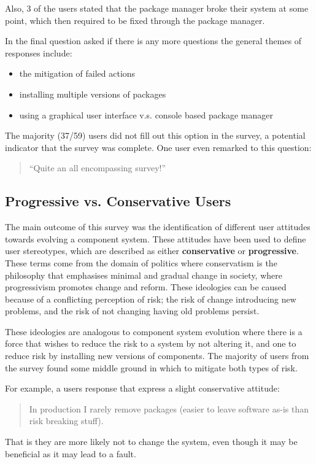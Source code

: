 Also, 3 of the users stated that the package manager broke their system at some point, which then required to be fixed through the package manager.

In the final question asked if there is any more questions the general themes of responses include:
\begin{itemize}
  \item the mitigation of failed actions
  \item installing multiple versions of packages
  \item using a graphical user interface v.s. console based package manager
\end{itemize} 
The majority (37/59) users did not fill out this option in the survey, a potential indicator that the survey was complete.
One user even remarked to this question:
\begin{quote}
``Quite an all encompassing survey!''
\end{quote}

\subsection{Progressive vs. Conservative Users}
The main outcome of this survey was the identification of different user attitudes towards evolving a component system.
These attitudes have been used to define user stereotypes, which are described as either \textbf{conservative} or \textbf{progressive}.
These terms come from the domain of politics where conservatism is the philosophy that emphasises minimal and gradual change in society,
where progressivism promotes change and reform.
These ideologies can be caused because of a conflicting perception of risk; the risk of change introducing new problems, and the risk of not changing having old problems persist.

These ideologies are analogous to component system evolution where there is a force that wishes to reduce the risk to a system by not altering it,
and one to reduce risk by installing new versions of components.
The majority of users from the survey found some middle ground in which to mitigate both types of risk.

For example, a users response that express a slight conservative attitude:
\begin{quotation}
In production I rarely remove packages (easier to leave software as-is than risk breaking stuff).
\end{quotation}
That is they are more likely not to change the system, even though it may be beneficial as it may lead to a fault. 

